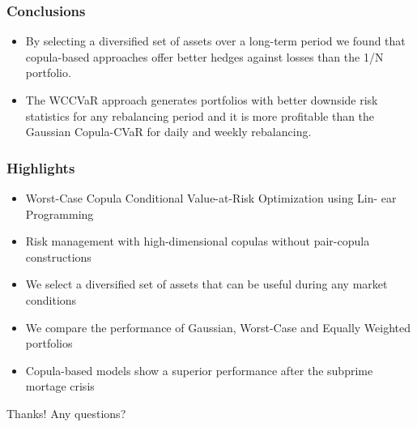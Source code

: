 \documentclass[pdf,10pt,xcolor=dvipsnames,hide notes]{beamer}
\begin{document}
\begin{frame}[label=frame9d]
	\frametitle{Conclusions}
	
	\begin{itemize}
		\justifying
		
		\item By selecting a diversified set of assets over a long-term period we found that copula-based approaches offer better hedges against losses than the 1/N portfolio.
		
		\vspace{0.3cm}
		
		\item The WCCVaR approach generates portfolios with better downside
		risk statistics for any rebalancing period and it is more profitable than the Gaussian Copula-CVaR for daily and weekly rebalancing. 
		
		\end{itemize}
	
\end{frame}
		
		\begin{frame}[label=frame9e]
		\frametitle{Highlights}
		
		\begin{itemize}
			\justifying
		
		\item Worst-Case Copula Conditional Value-at-Risk Optimization using Lin-
		ear Programming
		
		\vspace{0.3cm}
		
		\item Risk management with high-dimensional copulas without pair-copula
		constructions
		
		\vspace{0.3cm}
		
		\item We select a diversified set of assets that can be useful during any market conditions
		
		\vspace{0.3cm}
		
		\item We compare the performance of Gaussian, Worst-Case and Equally
		Weighted portfolios
		
		\vspace{0.3cm}
		
		\item Copula-based models show a superior performance after the subprime
		mortage crisis
		
		\end{itemize}
	
\end{frame}


\begin{frame}

\centering
\Large{Thanks! Any questions?}

\end{frame}
\end{document}
